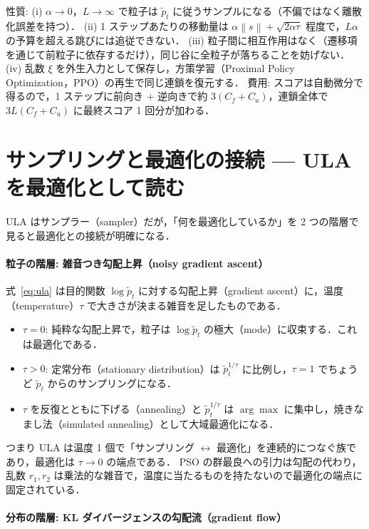 \documentclass[a4paper,11pt]{article}
\newcommand{\ptil}{\tilde p_t}
\newcommand{\nrm}[1]{\left\lVert #1 \right\rVert}
\begin{document}
性質: (i) $\alpha \to 0$，$L \to \infty$ で粒子は $\ptil$ に従うサンプルになる（不偏ではなく離散化誤差を持つ）．
(ii) 1 ステップあたりの移動量は $\alpha \nrm{s} + \sqrt{2\alpha\tau}$ 程度で，$L \alpha$ の予算を超える跳びには追従できない．
(iii) 粒子間に相互作用はなく（遷移項を通じて前粒子に依存するだけ），同じ谷に全粒子が落ちることを妨げない．
(iv) 乱数 $\xi$ を外生入力として保存し，方策学習（Proximal Policy Optimization，PPO）の再生で同じ連鎖を復元する．
費用: スコアは自動微分で得るので，1 ステップに前向き $+$ 逆向きで約 $3(C_f + C_u)$，連鎖全体で $3L(C_f + C_u)$ に最終スコア 1 回分が加わる．

\section{サンプリングと最適化の接続 --- ULA を最適化として読む}

ULA はサンプラー（sampler）だが，「何を最適化しているか」を 2 つの階層で見ると最適化との接続が明確になる．

\paragraph{粒子の階層: 雑音つき勾配上昇（noisy gradient ascent）}
式~\eqref{eq:ula} は目的関数 $\log \ptil$ に対する勾配上昇（gradient ascent）に，温度（temperature）$\tau$ で大きさが決まる雑音を足したものである．
\begin{itemize}
  \item $\tau = 0$: 純粋な勾配上昇で，粒子は $\log \ptil$ の極大（mode）に収束する．これは最適化である．
  \item $\tau > 0$: 定常分布（stationary distribution）は $\ptil^{1/\tau}$ に比例し，$\tau = 1$ でちょうど $\ptil$ からのサンプリングになる．
  \item $\tau$ を反復とともに下げる（annealing）と $\ptil^{1/\tau}$ は $\arg\max$ に集中し，焼きなまし法（simulated annealing）として大域最適化になる．
\end{itemize}
つまり ULA は温度 1 個で「サンプリング $\leftrightarrow$ 最適化」を連続的につなぐ族であり，最適化は $\tau \to 0$ の端点である．
PSO の群最良への引力は勾配の代わり，乱数 $r_1, r_2$ は乗法的な雑音で，温度に当たるものを持たないので最適化の端点に固定されている．

\paragraph{分布の階層: KL ダイバージェンスの勾配流（gradient flow）}
\end{document}

